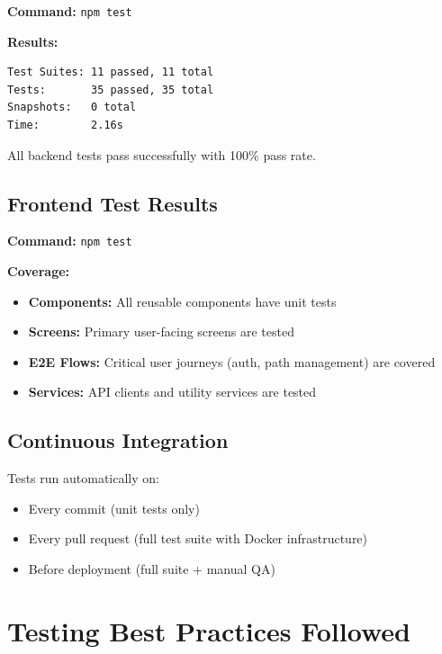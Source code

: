 \textbf{Command:} \texttt{npm test}

\textbf{Results:}
\begin{verbatim}
Test Suites: 11 passed, 11 total
Tests:       35 passed, 35 total
Snapshots:   0 total
Time:        2.16s
\end{verbatim}

All backend tests pass successfully with 100\% pass rate.

\subsection{Frontend Test Results}
\label{subsec:frontend_test_results}

\textbf{Command:} \texttt{npm test}

\textbf{Coverage:}
\begin{itemize}
    \item \textbf{Components:} All reusable components have unit tests
    \item \textbf{Screens:} Primary user-facing screens are tested
    \item \textbf{E2E Flows:} Critical user journeys (auth, path management) are covered
    \item \textbf{Services:} API clients and utility services are tested
\end{itemize}

\subsection{Continuous Integration}
\label{subsec:ci_results}

Tests run automatically on:
\begin{itemize}
    \item Every commit (unit tests only)
    \item Every pull request (full test suite with Docker infrastructure)
    \item Before deployment (full suite + manual QA)
\end{itemize}

\section{Testing Best Practices Followed}
\label{sec:testing_best_practices}


